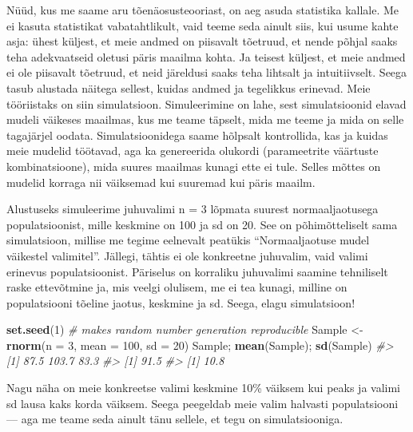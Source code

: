 \documentclass[]{book}
\newenvironment{Shaded}{\begin{snugshade}}{\end{snugshade}}
\newcommand{\KeywordTok}[1]{\textcolor[rgb]{0.13,0.29,0.53}{\textbf{#1}}}
\newcommand{\DataTypeTok}[1]{\textcolor[rgb]{0.13,0.29,0.53}{#1}}
\newcommand{\DecValTok}[1]{\textcolor[rgb]{0.00,0.00,0.81}{#1}}
\newcommand{\StringTok}[1]{\textcolor[rgb]{0.31,0.60,0.02}{#1}}
\newcommand{\CommentTok}[1]{\textcolor[rgb]{0.56,0.35,0.01}{\textit{#1}}}
\newcommand{\NormalTok}[1]{#1}
\begin{document}
Nüüd, kus me saame aru tõenäosusteooriast, on aeg asuda statistika
kallale. Me ei kasuta statistikat vabatahtlikult, vaid teeme seda ainult
siis, kui usume kahte asja: ühest küljest, et meie andmed on piisavalt
tõetruud, et nende põhjal saaks teha adekvaatseid oletusi päris maailma
kohta. Ja teisest küljest, et meie andmed ei ole piisavalt tõetruud, et
neid järeldusi saaks teha lihtsalt ja intuitiivselt. Seega tasub
alustada näitega sellest, kuidas andmed ja tegelikkus erinevad. Meie
tööriistaks on siin simulatsioon. Simuleerimine on lahe, sest
simulatsioonid elavad mudeli väikeses maailmas, kus me teame täpselt,
mida me teeme ja mida on selle tagajärjel oodata. Simulatsioonidega
saame hõlpsalt kontrollida, kas ja kuidas meie mudelid töötavad, aga ka
genereerida olukordi (parameetrite väärtuste kombinatsioone), mida
suures maailmas kunagi ette ei tule. Selles mõttes on mudelid korraga
nii väiksemad kui suuremad kui päris maailm.

Alustuseks simuleerime juhuvalimi n = 3 lõpmata suurest normaaljaotusega
populatsioonist, mille keskmine on 100 ja sd on 20. See on
põhimõtteliselt sama simulatsioon, millise me tegime eelnevalt peatükis
``Normaaljaotuse mudel väikestel valimitel''. Jällegi, tähtis ei ole
konkreetne juhuvalim, vaid valimi erinevus populatsioonist. Päriselus on
korraliku juhuvalimi saamine tehniliselt raske ettevõtmine ja, mis
veelgi olulisem, me ei tea kunagi, milline on populatsiooni tõeline
jaotus, keskmine ja sd. Seega, elagu simulatsioon!

\begin{Shaded}
\begin{Highlighting}[]
\KeywordTok{set.seed}\NormalTok{(}\DecValTok{1}\NormalTok{) }\CommentTok{# makes random number generation reproducible}
\NormalTok{Sample <-}\StringTok{ }\KeywordTok{rnorm}\NormalTok{(}\DataTypeTok{n =} \DecValTok{3}\NormalTok{, }\DataTypeTok{mean =} \DecValTok{100}\NormalTok{, }\DataTypeTok{sd =} \DecValTok{20}\NormalTok{)}
\NormalTok{Sample; }\KeywordTok{mean}\NormalTok{(Sample); }\KeywordTok{sd}\NormalTok{(Sample)}
\CommentTok{#> [1]  87.5 103.7  83.3}
\CommentTok{#> [1] 91.5}
\CommentTok{#> [1] 10.8}
\end{Highlighting}
\end{Shaded}

Nagu näha on meie konkreetse valimi keskmine 10\% väiksem kui peaks ja
valimi sd lausa kaks korda väiksem. Seega peegeldab meie valim halvasti
populatsiooni --- aga me teame seda ainult tänu sellele, et tegu on
simulatsiooniga.
\end{document}
